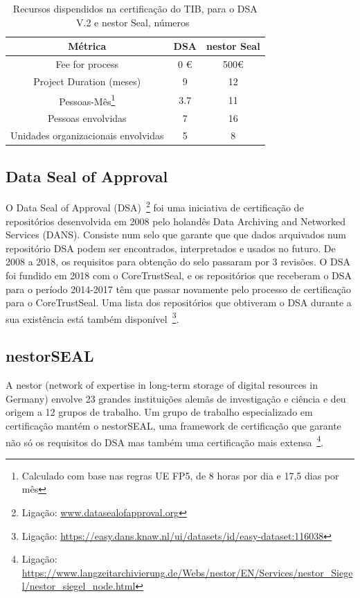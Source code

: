 \documentclass[sigconf,nonacm]{acmart}
\begin{document}
\begin{table}
    \caption{Recursos dispendidos na certificação do TIB, para o DSA V.2 e nestor Seal, números~\cite{Lindlar_Schwab_2019}}\label{tab:tib_certification_numbers}
    \centering
    \scriptsize
    \begin{tabular}{|c|c|c|}
	\hline
    \textbf{Métrica} & \textbf{DSA} & \textbf{nestor Seal}\\
	\hline
	\hline
	Fee for process & 0 €  & 500€ \\
    Project Duration (meses) & 9 & 12 \\
	Pessoas-Mês\footnote{Calculado com base nas regras UE FP5, de 8 horas por dia e 17,5 dias por mês} & 3.7 & 11\\
	Pessoas envolvidas & 7 & 16\\
	Unidades organizacionais envolvidas & 5 & 8\\
	\hline
    \end{tabular}
    \scriptsize
\end{table}

\subsection{Data Seal of Approval} %
\label{sub:data_seal_of_approval}

O Data Seal of Approval (DSA)~\footnote{Ligação: \url{www.datasealofapproval.org}} foi uma iniciativa de certificação de repositórios desenvolvida em 2008 pelo holandês Data Archiving and Networked Services (DANS). Consiste num selo que garante que que dados arquivados num repositório DSA podem ser encontrados, interpretados e usados no futuro. De 2008 a 2018, os requisitos para obtenção do selo passaram por 3 revisões. O DSA foi fundido em 2018 com o CoreTrustSeal, e os repositórios que receberam o DSA para o período 2014-2017 têm que passar novamente pelo processo de certificação para o CoreTrustSeal. Uma lista dos repositórios que obtiveram o DSA durante a sua existência está também disponível~\footnote{Ligação: \url{https://easy.dans.knaw.nl/ui/datasets/id/easy-dataset:116038}}.


\subsection{nestorSEAL} %
\label{sub:nestorseal}

A nestor (network of expertise in long-term storage of digital resources in Germany) envolve 23 grandes instituições alemãs de investigação e ciência e deu origem a 12 grupos de trabalho. Um grupo de trabalho especializado em certificação mantém o nestorSEAL, uma framework de certificação que garante não só os requisitos do DSA mas também uma certificação mais extensa~\footnote{Ligação: \url{https://www.langzeitarchivierung.de/Webs/nestor/EN/Services/nestor_Siegel/nestor_siegel_node.html}}. 
\end{document}
